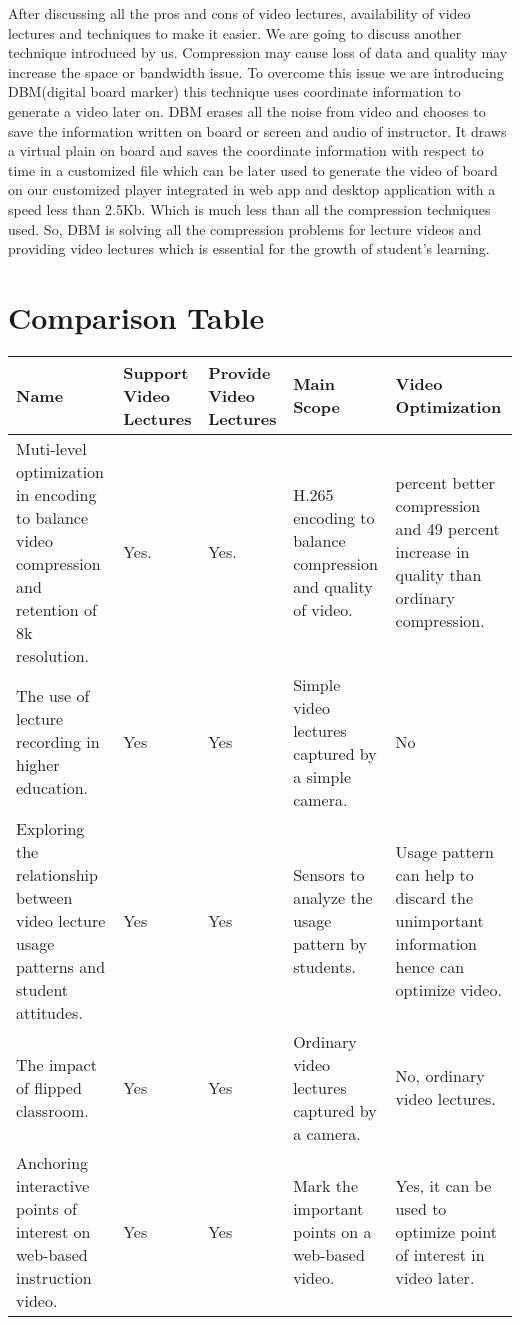 After discussing all the pros and cons of video lectures, availability of video lectures and techniques to make it easier. We are going to discuss another technique introduced by us. Compression may cause loss of data and quality may increase the space or bandwidth issue. To overcome this issue we are introducing DBM(digital board marker) this technique uses coordinate information to generate a video later on. DBM erases all the noise from video and chooses to save the information written on board or screen and audio of instructor. It draws a virtual plain on board and saves the coordinate information with respect to time in a customized file which can be later used to generate the video of board on our customized player integrated in web app and desktop application with a speed less than 2.5Kb. Which is much less than all the compression techniques used. So, DBM is solving all the compression problems for lecture videos and providing video lectures which is essential for the growth of student's learning.
 

 
\section{Comparison Table}

\begin{sideways}
\centering
\begin{tabularx}{1.5\textwidth} { 
  | >{\raggedright\arraybackslash}X 
  | >{\centering\arraybackslash}X | >{\centering\arraybackslash}X | >{\centering\arraybackslash}X | >{\raggedleft\arraybackslash}X | }
 \hline
\bfseries{Name} & \bfseries{Support Video Lectures} &\bfseries{Provide Video Lectures} &\bfseries{Main Scope} & \bfseries{Video Optimization}  \\
\hline
Muti-level optimization in encoding to balance video compression and retention of 8k resolution.\cite{Murthy2016}
& Yes.
& Yes.
& H.265 encoding to balance compression and quality of video.
& 59 percent better compression and 49 percent increase in quality than ordinary compression.
\\
\hline
The use of lecture recording in higher education.\cite{OCallaghan2017}
& Yes
& Yes
& Simple video lectures captured by a simple camera.
& No
\\
\hline
Exploring the relationship between video lecture usage patterns and student attitudes.\cite{Giannakos2016}
& Yes
& Yes
& Sensors to analyze the usage pattern by students.
& Usage pattern can help to discard the unimportant information hence can optimize video.
\\
\hline
The impact of flipped classroom.\cite{Lo2019}
& Yes
& Yes
& Ordinary video lectures captured by a camera.
& No, ordinary video lectures.
\\
\hline
Anchoring interactive points of interest on web-based instruction video.\cite{Pimentel2019}
& Yes
& Yes
& Mark the important points on a web-based video.
& Yes, it can be used to optimize point of interest in video later.
\\
\hline
\end{tabularx}
\end{sideways}


